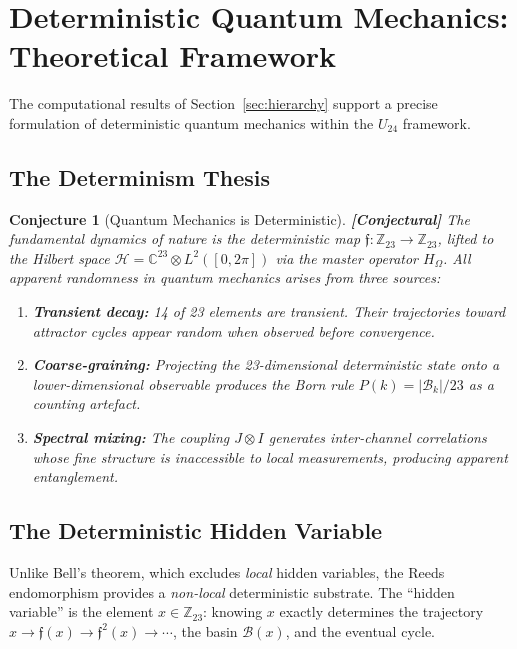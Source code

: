 \documentclass[12pt,a4paper]{article}
\newcommand{\conjectural}[1]{\textcolor{conjectural}{\textbf{[Conjectural]}} #1}
\newtheorem{conjecture}[theorem]{Conjecture}
\theoremstyle{definition}
\theoremstyle{remark}
\newcommand{\Reeds}{\mathfrak{f}}
\newcommand{\Zp}{\mathbb{Z}_{23}}
\newcommand{\Hilb}{\mathcal{H}}
\newcommand{\Basin}{\mathcal{B}}
\newcommand{\Jcoup}{J}
\newcommand{\HOmega}{H_\Omega}
\begin{document}
\section{Deterministic Quantum Mechanics: Theoretical Framework}
\label{sec:deterministic_qm}

The computational results of Section~\ref{sec:hierarchy} support a precise
formulation of deterministic quantum mechanics within the $U_{24}$ framework.

\subsection{The Determinism Thesis}

\begin{conjecture}[Quantum Mechanics is Deterministic]
\label{conj:determinism}
\conjectural{The fundamental dynamics of nature is the deterministic map
$\Reeds: \Zp \to \Zp$, lifted to the Hilbert space $\Hilb = \mathbb{C}^{23}
\otimes L^2([0,2\pi])$ via the master operator $\HOmega$. All apparent
randomness in quantum mechanics arises from three sources:}
\begin{enumerate}
  \item \textbf{Transient decay:} 14 of 23 elements are transient. Their
  trajectories toward attractor cycles \emph{appear} random when observed before
  convergence.
  \item \textbf{Coarse-graining:} Projecting the 23-dimensional deterministic
  state onto a lower-dimensional observable produces the Born rule
  $P(k) = |\Basin_k|/23$ as a counting artefact.
  \item \textbf{Spectral mixing:} The coupling $\Jcoup \otimes I$ generates
  inter-channel correlations whose fine structure is inaccessible to local
  measurements, producing apparent entanglement.
\end{enumerate}
\end{conjecture}

\subsection{The Deterministic Hidden Variable}

Unlike Bell's theorem, which excludes \emph{local} hidden variables, the Reeds
endomorphism provides a \emph{non-local} deterministic substrate. The ``hidden
variable'' is the element $x \in \Zp$: knowing $x$ exactly determines the
trajectory $x \to \Reeds(x) \to \Reeds^2(x) \to \cdots$, the basin $\Basin(x)$,
and the eventual cycle.
\end{document}
